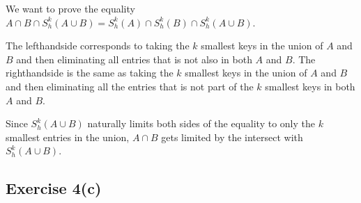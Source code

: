 
We want to prove the equality $A \cap B \cap S^{k}_{h}(A \cup B) = S^{k}_{h}(A)
\cap S^{k}_{h}(B) \cap S^{k}_{h}(A \cup B)$.

The lefthandside corresponds to taking the $k$ smallest keys in the union of
$A$ and $B$ and then eliminating all entries that is not also in both $A$ and
$B$.
%
The righthandside is the same as taking the $k$ smallest keys in the union of
$A$ and $B$ and then eliminating all the entries that is not part of the $k$
smallest keys in both $A$ and $B$.

Since $S^{k}_{h}(A \cup B)$ naturally limits both sides of the equality to only
the $k$ smallest entries in the union, $A \cap B$ gets limited by the intersect
with $S^{k}_{h}(A \cup B)$.


\subsection{Exercise 4(c)}

